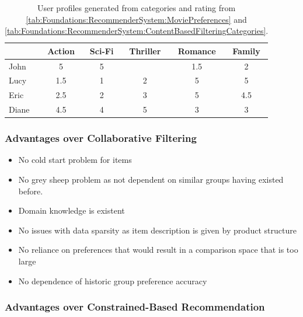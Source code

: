 \begin{table}
    \centering    
    \begin{tabular}{ l | c | c | c | c | c }
        & Action & Sci-Fi & Thriller & Romance & Family \\ \hline
        John  & 5 & 5 & & 1.5 & 2 \\
        Lucy  & 1.5 & 1 & 2 & 5 & 5 \\
        Eric  & 2.5 & 2 & 3 & 5 & 4.5 \\
        Diane & 4.5 & 4 & 5 & 3 & 3  \\
    \end{tabular}
    \caption{User profiles generated from categories and rating from \autoref{tab:Foundations:RecommenderSystem:MoviePreferences} and \autoref{tab:Foundations:RecommenderSystem:ContentBasedFilteringCategories}.}
    
    \label{tab:Foundations:RecommenderSystem:ContentBasedFilteringProfiles}
\end{table}

\subsubsection{Advantages over Collaborative Filtering}
\begin{itemize}
    \item No cold start problem for items
    \item No grey sheep problem as not dependent on similar groups having existed before.
    \item Domain knowledge is existent
    \item No issues with data sparsity as item description is given by product structure
    \item No reliance on preferences that would result in a comparison space that is too large
    \item No dependence of historic group preference accuracy 
\end{itemize}

\todo[inline]{
    Advantages over Critique-Based Recommendation %
}


\subsubsection{Advantages over Constrained-Based Recommendation}


